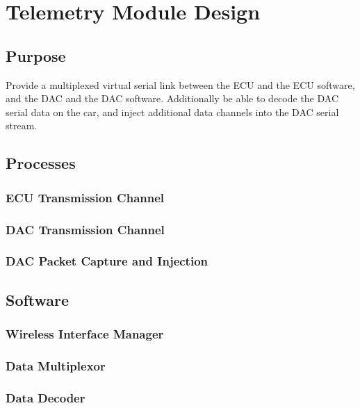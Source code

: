 \section{Telemetry Module Design\label{sec:Telemetry-Module-Design}}


\subsection{Purpose}

Provide a multiplexed virtual serial link between the ECU and the ECU software, and the DAC and the DAC software. Additionally be able to decode the DAC serial data on the car, and inject additional data channels into the DAC serial stream.


\subsection{Processes}


\subsubsection{ECU Transmission Channel}


\subsubsection{DAC Transmission Channel}


\subsubsection{DAC Packet Capture and Injection}


\subsection{Software}


\subsubsection{Wireless Interface Manager }


\subsubsection{Data Multiplexor}


\subsubsection{Data Decoder }


